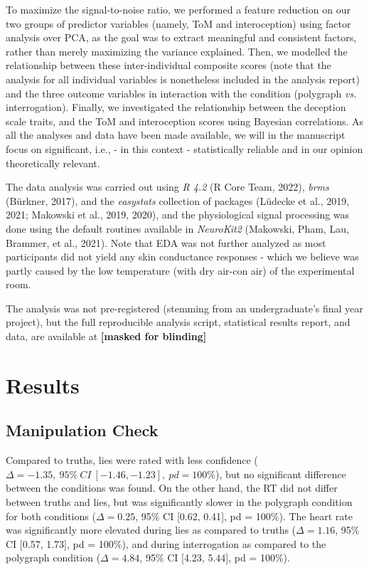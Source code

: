 \documentclass[
  man,mask,floatsintext]{apa6}
\begin{document}
To maximize the signal-to-noise ratio, we performed a feature reduction on our two groups of predictor variables (namely, ToM and interoception) using factor analysis over PCA, as the goal was to extract meaningful and consistent factors, rather than merely maximizing the variance explained. Then, we modelled the relationship between these inter-individual composite scores (note that the analysis for all individual variables is nonetheless included in the analysis report) and the three outcome variables in interaction with the condition (polygraph \emph{vs.} interrogation). Finally, we investigated the relationship between the deception scale traits, and the ToM and interoception scores using Bayesian correlations. As all the analyses and data have been made available, we will in the manuscript focus on significant, i.e., - in this context - statistically reliable and in our opinion theoretically relevant.

The data analysis was carried out using \emph{R 4.2} (R Core Team, 2022), \emph{brms} (Bürkner, 2017), and the \emph{easystats} collection of packages (Lüdecke et al., 2019, 2021; Makowski et al., 2019, 2020), and the physiological signal processing was done using the default routines available in \emph{NeuroKit2} (Makowski, Pham, Lau, Brammer, et al., 2021). Note that EDA was not further analyzed as most participants did not yield any skin conductance responses - which we believe was partly caused by the low temperature (with dry air-con air) of the experimental room.

The analysis was not pre-registered (stemming from an undergraduate's final year project), but the full reproducible analysis script, statistical results report, and data, are available at
\textbf{{[}masked for blinding{]}}

\section{Results}\label{results}

\subsection{Manipulation Check}\label{manipulation-check}

Compared to truths, lies were rated with less confidence (\(\Delta=-1.35,~95\%~CI~[-1.46, -1.23],~pd = 100\%\)), but no significant difference between the conditions was found. On the other hand, the RT did not differ between truths and lies, but was significantly slower in the polygraph condition for both conditions (\(\Delta=0.25\), 95\% CI {[}0.62, 0.41{]}, pd = 100\%). The heart rate was significantly more elevated during lies as compared to truths (\(\Delta=1.16\), 95\% CI {[}0.57, 1.73{]}, pd = 100\%), and during interrogation as compared to the polygraph condition (\(\Delta=4.84\), 95\% CI {[}4.23, 5.44{]}, pd = 100\%).
\end{document}
